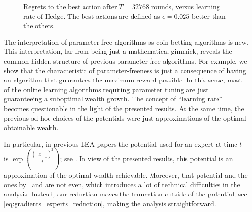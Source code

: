 \begin{figure}[t]
\begin{center}
\caption{\footnotesize{Regrets to the best action after $T = 32768$ rounds, versus learning rate of Hedge. The best actions are defined as $\epsilon=0.025$ better than the others.}}
\label{fig:exp}
\end{center}
\end{figure}


The interpretation of parameter-free algorithms as coin-betting algorithms is
new. This interpretation, far from being just a mathematical gimmick, reveals
the common hidden structure of previous parameter-free algorithms. For example,
we show that the characteristic of parameter-freeness is just a
consequence of having an algorithm that guarantees the maximum reward possible.
In this sense, most of the online learning algorithms requiring parameter tuning
are just guaranteeing a suboptimal wealth growth. The concept of
``learning rate'' becomes questionable in the light of the presented results.
At the same time, the previous ad-hoc choices of the potentials were just
approximations of the optimal obtainable wealth.

In particular, in previous \ac{LEA} papers the potential used for an expert at
time $t$ is $\exp \left(\tfrac{([x]_+)^2}{t} \right)$; see \citep{Chaudhuri-Freund-Hsu-2009,
Luo-Schapire-2014, Luo-Schapire-2015}. In view of the presented results, this potential 
is an approximation of the optimal wealth achievable. Moreover, that potential and the ones by~\citet{Chernov-Vovk-2010}
and \cite{Koolen-van-Erven-2015} are not even, which introduces a lot of
technical difficulties in the analysis. Instead, our reduction moves the
truncation outside of the potential, see \eqref{eq:gradients_experts_reduction}, making the analysis straightforward.

